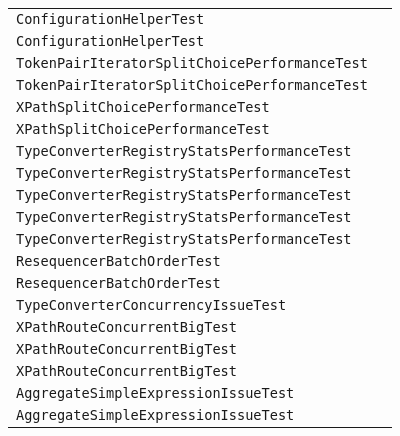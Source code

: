\begin{center}
\begin{tabular}{ll}
\lstinline/ConfigurationHelperTest/&\raisebox{0pt}{\lstinline/logConfigurationObject(EndpointConfiguration)/}\\
\lstinline/ConfigurationHelperTest/&\raisebox{0pt}{\lstinline/logConfigurationObject(EndpointConfiguration)/}\\
\lstinline/TokenPairIteratorSplitChoicePerformanceTest/&\raisebox{0pt}{\lstinline/createDataFile(Logger,int)/}\\
\lstinline/TokenPairIteratorSplitChoicePerformanceTest/&\raisebox{0pt}{\lstinline/createDataFile(Logger,int)/}\\
\lstinline/XPathSplitChoicePerformanceTest/&\raisebox{0pt}{\lstinline/createDataFile(Logger,int)/}\\
\lstinline/XPathSplitChoicePerformanceTest/&\raisebox{0pt}{\lstinline/createDataFile(Logger,int)/}\\
\lstinline/TypeConverterRegistryStatsPerformanceTest/&\raisebox{0pt}{\lstinline/testTransform()/}\\
\lstinline/TypeConverterRegistryStatsPerformanceTest/&\raisebox{0pt}{\lstinline/testTransform()/}\\
\lstinline/TypeConverterRegistryStatsPerformanceTest/&\raisebox{0pt}{\lstinline/testTransform()/}\\
\lstinline/TypeConverterRegistryStatsPerformanceTest/&\raisebox{0pt}{\lstinline/testTransform()/}\\
\lstinline/TypeConverterRegistryStatsPerformanceTest/&\raisebox{0pt}{\lstinline/testTransform()/}\\
\lstinline/ResequencerBatchOrderTest/&\raisebox{0pt}{\lstinline/testIteration(inti)/}\\
\lstinline/ResequencerBatchOrderTest/&\raisebox{0pt}{\lstinline/testIteration(inti)/}\\
\lstinline/TypeConverterConcurrencyIssueTest/&\raisebox{0pt}{\lstinline/testTypeConverter()/}\\
\lstinline/XPathRouteConcurrentBigTest/&\raisebox{0pt}{\lstinline/doSendMessages(int)/}\\
\lstinline/XPathRouteConcurrentBigTest/&\raisebox{0pt}{\lstinline/doSendMessages(int)/}\\
\lstinline/XPathRouteConcurrentBigTest/&\raisebox{0pt}{\lstinline/doSendMessages(int)/}\\
\lstinline/AggregateSimpleExpressionIssueTest/&\raisebox{0pt}{\lstinline/xxxtestAggregateSimpleExpression()/}\\
\lstinline/AggregateSimpleExpressionIssueTest/&\raisebox{0pt}{\lstinline/xxxtestAggregateSimpleExpression()/}\\

\end{tabular}
\end{center}

